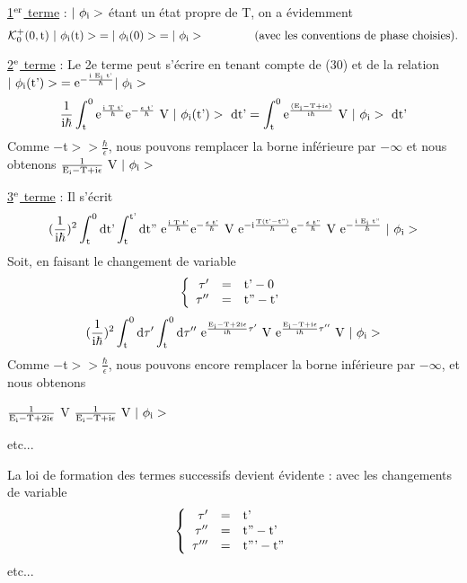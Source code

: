 \ul{1$^{\text{er}}$ terme} : $|\ \phi_{\text{i}}>$ étant un état propre de T, on a évidemment
\[
\mc{K}_0^+(0,\mt{t})\ |\ \phi_\mt{i}(\mt{t})>\;=|\ \phi_\mt{i}(0)>\;=|\ \phi_\mt{i}> \hspace{1.5cm} \mt{(avec les conventions de phase choisies).}
\]

\ul{2$^{\text{e}}$ terme} : Le 2e terme peut s'écrire en tenant compte de (30) et de la
relation $|\ \phi_{\text{i}}(\text{t'})>\;=\text{e}^{-\frac{\text{i E}_{\text{i}}\text{ t'}}{\hbar}}|\ \phi_{\text{i}}>$
\[
\frac{1}{\mt{i}\hbar}
\int_\mt{t}^0\mt{e}^{\frac{\mt{i T t'}}{\hbar}}\mt{e}^{-\frac{\epsilon\mt{ t'}}{\hbar}}\mt{ V }|\ \phi_\mt{i}(\mt{t'})>\mt{ dt'}=
\int_\mt{t}^0\mt{e}^{\frac{\mt{(E}_\mt{i}-\mt{T}+\mt{i}\epsilon)}{\mt{i}\hbar}}\mt{ V }|\ \phi_\mt{i}>\mt{ dt'}
\]
Comme $-$t$>>\frac{\hbar}{\epsilon}$, nous pouvons remplacer la borne inférieure par $-\infty$
et nous obtenons $\frac{1}{\text{E}_{\text{i}}-\text{T}+\text{i}\epsilon}\text{ V }|\ \phi_{\text{i}}>$

\ul{3$^{\text{e}}$ terme} : Il s'écrit
\[
(\frac{1}{\mt{i}\hbar})^2
\int_\mt{t}^0\mt{dt'}\int_\mt{t}^\mt{t'}\mt{dt'' }
\mt{e}^{\frac{\mt{i T t'}}{\hbar}}\mt{e}^{-\frac{\epsilon\mt{ t'}}{\hbar}}
\mt{ V }\mt{e}^{-\mt{i}\frac{\mt{T(t'}-\mt{t''})}{\hbar}}\mt{e}^{-\frac{\epsilon\mt{ t''}}{\hbar}}
\mt{ V }\mt{e}^{-\frac{\mt{i E}_\mt{i}\mt{ t''}}{\hbar}}\ |\ \phi_\mt{i}>
\]
Soit, en faisant le changement de variable
\[
\left\{
\begin{array}{rcl}
\tau' & = & \text{t'}-0 \\
\tau'' & = & \text{t''}-\text{t'}
\end{array}\right.
\]
\[
(\frac{1}{\text{i}\hbar})^2
\int_{\text{t}}^0\text{d}\tau'\int_{\text{t}}^0\text{d}\tau''
\text{ e}^{\frac{\text{E}_{\text{i}}-\text{T}+2\text{i}\epsilon}{\text{i}\hbar}\tau'}
\text{ V }\text{e}^{\frac{\text{E}_{\text{i}}-\text{T}+\text{i}\epsilon}{\text{i}\hbar}\tau''}
\text{ V }|\ \phi_{\text{i}}>
\]
Comme $-$t$>>\frac{\hbar}{\epsilon}$, nous pouvons encore remplacer la borne inférieure par $-\infty$,
et nous obtenons
\begin{center}
$\frac{1}{\text{E}_{\text{i}}-\text{T}+2\text{i}\epsilon}$ V 
$\frac{1}{\text{E}_{\text{i}}-\text{T}+\text{i}\epsilon}\text{ V }|\ \phi_{\text{i}}>$
\end{center}
etc...

La loi de formation des termes successifs devient évidente : avec les
changements de variable
\[
\left\{
\begin{array}{rcl}
\tau' & = & \text{t'} \\
\tau'' & = & \text{t''}-\text{t'} \\
\tau''' & = & \text{t'''}-\text{t''}
\end{array}\right.
\]
etc...

